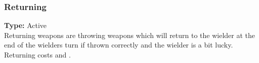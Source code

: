 \subsubsection{Returning}
\label{iqty:returning}
\textbf{Type:} Active\\
Returning weapons are throwing weapons which will return
to the wielder at the end of the wielders turn if thrown
correctly and the wielder is a bit lucky.
Returning costs and \advantage.

